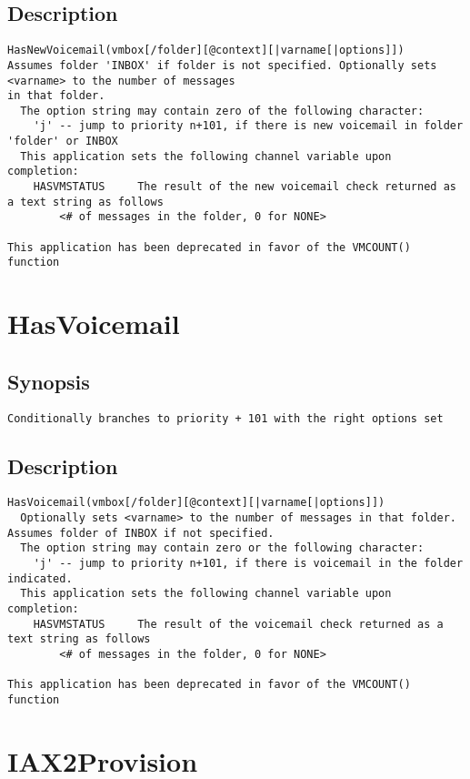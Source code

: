 \subsection{Description}
\begin{verbatim}
HasNewVoicemail(vmbox[/folder][@context][|varname[|options]])
Assumes folder 'INBOX' if folder is not specified. Optionally sets <varname> to the number of messages
in that folder.
  The option string may contain zero of the following character:
	'j' -- jump to priority n+101, if there is new voicemail in folder 'folder' or INBOX
  This application sets the following channel variable upon completion:
	HASVMSTATUS		The result of the new voicemail check returned as a text string as follows
		<# of messages in the folder, 0 for NONE>

This application has been deprecated in favor of the VMCOUNT() function

\end{verbatim}


\section{HasVoicemail}
\subsection{Synopsis}
\begin{verbatim}
Conditionally branches to priority + 101 with the right options set
\end{verbatim}
\subsection{Description}
\begin{verbatim}
HasVoicemail(vmbox[/folder][@context][|varname[|options]])
  Optionally sets <varname> to the number of messages in that folder.  Assumes folder of INBOX if not specified.
  The option string may contain zero or the following character:
	'j' -- jump to priority n+101, if there is voicemail in the folder indicated.
  This application sets the following channel variable upon completion:
	HASVMSTATUS		The result of the voicemail check returned as a text string as follows
		<# of messages in the folder, 0 for NONE>

This application has been deprecated in favor of the VMCOUNT() function

\end{verbatim}


\section{IAX2Provision}

